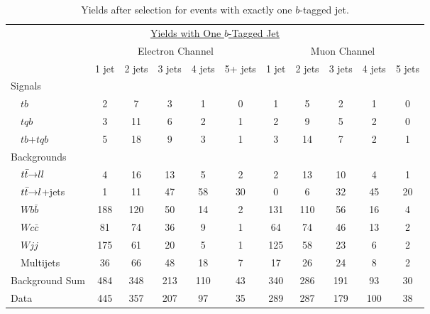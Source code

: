 \clearpage

\begin{table}[!h!tbp]
\begin{center}
\begin{minipage}{6in}
\begin{ruledtabular}
\begin{tabular}{l||ccccc|ccccc}
\multicolumn{11}{c}{\hspace{1in}\underline{Yields with One $b$-Tagged Jet}} \vspace{0.1in} \\
& \multicolumn{5}{c|}{Electron Channel} & \multicolumn{5}{c}{Muon Channel} \\
                         & 1 jet & 2 jets & 3 jets & 4 jets & 5+ jets
                         & 1 jet & 2 jets & 3 jets & 4 jets & 5 jets \\
\hline
Signals                  &      &       &      &      &      &      &      &      &      &      \\
~~$tb$                   &    2 &     7 &    3 &    1 &    0 &    1 &    5 &    2 &    1 &    0 \\
~~$tqb$                  &    3 &    11 &    6 &    2 &    1 &    2 &    9 &    5 &    2 &    0 \\
~~$tb$+$tqb$             &    5 &    18 &    9 &    3 &    1 &    3 &   14 &    7 &    2 &    1 \\
Backgrounds              &      &       &      &      &      &      &      &      &      &      \\
~~${\mbox{$t\bar{t}$}}{\rightarrow}ll$     &    4 &    16 &   13 &    5 &    2 &    2 &   13 &   10 &    4 &    1 \\
~~${\mbox{$t\bar{t}$}}{\rightarrow}l$+jets &    1 &    11 &   47 &   58 &   30 &    0 &    6 &   32 &   45 &   20 \\
~~$Wb\bar{b}$            &  188 &   120 &   50 &   14 &    2 &  131 &  110 &   56 &   16 &    4 \\
~~$Wc\bar{c}$            &   81 &    74 &   36 &    9 &    1 &   64 &   74 &   46 &   13 &    2 \\
~~$Wjj$                  &  175 &    61 &   20 &    5 &    1 &  125 &   58 &   23 &    6 &    2 \\
~~Multijets              &   36 &    66 &   48 &   18 &    7 &   17 &   26 &   24 &    8 &    2 \\
\hline                                                                            
Background Sum           &  484 &   348 &  213 &  110 &   43 &  340 &  286 &  191 &   93 &   30 \\
\hline                                                                            
Data                     &  445 &   357 &  207 &   97 &   35 &  289 &  287 &  179 &  100 &   38
\end{tabular}
\end{ruledtabular}
\vspace{-0.1in}
\caption[onetagyields]{Yields after selection for events with exactly
one $b$-tagged jet.}
\label{onetag-yields}
\end{minipage}
\end{center}
\end{table}

